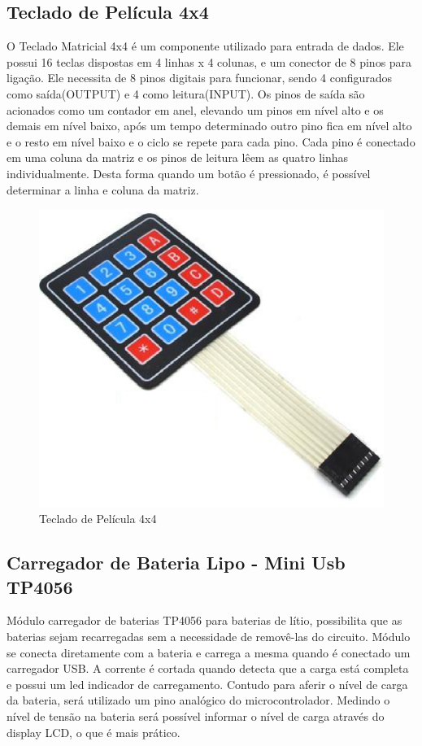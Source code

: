 \pagebreak

\subsection{Teclado de Película 4x4}
O Teclado Matricial 4x4 é um componente utilizado para entrada de dados. Ele possui 16 teclas dispostas em 4 linhas x 4 colunas, e um conector de 8 pinos para ligação. Ele necessita de 8 pinos digitais para funcionar, sendo 4 configurados como saída(OUTPUT) e 4 como leitura(INPUT). Os pinos de saída são acionados como um contador em anel, elevando um pinos em nível alto e os demais em nível baixo, após um tempo determinado outro pino fica em nível alto e o resto em nível baixo e o ciclo se repete para cada pino. Cada pino é conectado em uma coluna da matriz e os pinos de leitura lêem as quatro linhas individualmente. Desta forma quando um botão é pressionado,  é possível determinar a linha e coluna da matriz.

\begin{figure}[!h]
  \centering
  \includegraphics[keepaspectratio=true,scale=0.45]{figuras/teclado.eps}
  \caption{Teclado de Película 4x4}
\end{figure}

\subsection{Carregador de Bateria Lipo - Mini Usb TP4056}
Módulo carregador de baterias TP4056 para baterias de lítio, possibilita que as baterias sejam recarregadas sem a necessidade de removê-las do circuito. Módulo se conecta diretamente com a bateria e carrega a mesma quando é conectado um carregador USB. A corrente é cortada quando detecta que a carga está completa e possui um led indicador de carregamento. Contudo para aferir o nível de carga da bateria, será utilizado um pino analógico do microcontrolador. Medindo o nível de tensão na bateria será possível  informar o  nível de  carga através do display LCD, o que é mais prático.


